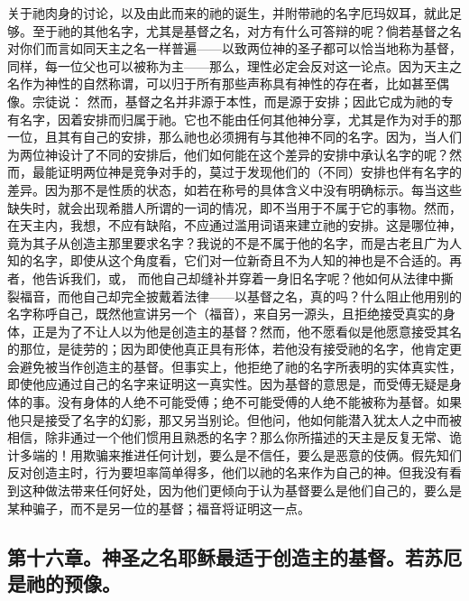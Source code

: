 关于祂肉身的讨论，以及由此而来的祂的诞生，并附带祂的名字厄玛奴耳，就此足够。至于祂的其他名字，尤其是基督之名，对方有什么可答辩的呢？倘若基督之名对你们而言如同天主之名一样普遍——以致两位神的圣子都可以恰当地称为基督，同样，每一位父也可以被称为主——那么，理性必定会反对这一论点。因为天主之名作为神性的自然称谓，可以归于所有那些声称具有神性的存在者，比如甚至偶像。宗徒说： 然而，基督之名并非源于本性，而是源于安排；因此它成为祂的专有名字，因着安排而归属于祂。它也不能由任何其他神分享，尤其是作为对手的那一位，且其有自己的安排，那么祂也必须拥有与其他神不同的名字。因为，当人们为两位神设计了不同的安排后，他们如何能在这个差异的安排中承认名字的呢？然而，最能证明两位神是竞争对手的，莫过于发现他们的（不同）安排也伴有名字的差异。因为那不是性质的状态，如若在称号的具体含义中没有明确标示。每当这些缺失时，就会出现希腊人所谓的一词的情况，即不当用于不属于它的事物。然而，在天主内，我想，不应有缺陷，不应通过滥用词语来建立祂的安排。这是哪位神，竟为其子从创造主那里要求名字？我说的不是不属于他的名字，而是古老且广为人知的名字，即使从这个角度看，它们对一位新奇且不为人知的神也是不合适的。再者，他告诉我们，或， 而他自己却缝补并穿着一身旧名字呢？他如何从法律中撕裂福音，而他自己却完全披戴着法律——以基督之名，真的吗？什么阻止他用别的名字称呼自己，既然他宣讲另一个（福音），来自另一源头，且拒绝接受真实的身体，正是为了不让人以为他是创造主的基督？然而，他不愿看似是他愿意接受其名的那位，是徒劳的；因为即使他真正具有形体，若他没有接受祂的名字，他肯定更会避免被当作创造主的基督。但事实上，他拒绝了祂的名字所表明的实体真实性，即使他应通过自己的名字来证明这一真实性。因为基督的意思是，而受傅无疑是身体的事。没有身体的人绝不可能受傅；绝不可能受傅的人绝不能被称为基督。如果他只是接受了名字的幻影，那又另当别论。但他问，他如何能潜入犹太人之中而被相信，除非通过一个他们惯用且熟悉的名字？那么你所描述的天主是反复无常、诡计多端的！用欺骗来推进任何计划，要么是不信任，要么是恶意的伎俩。假先知们反对创造主时，行为要坦率简单得多，他们以祂的名来作为自己的神。但我没有看到这种做法带来任何好处，因为他们更倾向于认为基督要么是他们自己的，要么是某种骗子，而不是另一位的基督；福音将证明这一点。\par


\subsection{第十六章。神圣之名耶稣最适于创造主的基督。若苏厄是祂的预像。}


